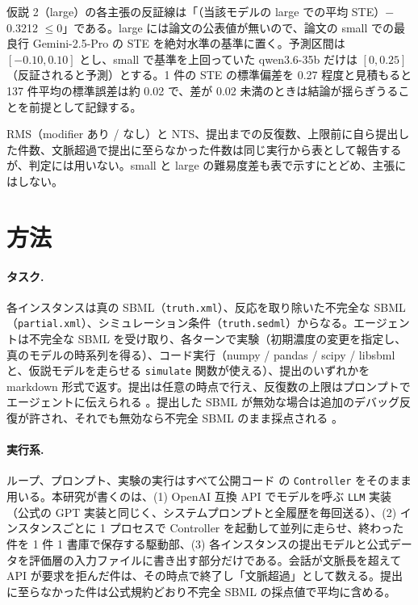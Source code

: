 \documentclass{article}
\providecommand{\unverified}[1]{#1}
\begin{document}
仮説 2（large）の各主張の反証線は「（当該モデルの large での平均 STE）$-$ \unverified{0.3212} $\le 0$」である。large には論文の公表値が無いので、論文の small での最良行 Gemini-2.5-Pro の STE \cite[s1.p5]{duan-2025-measuring} を絶対水準の基準に置く。予測区間は $[-0.10, 0.10]$ とし、small で基準を上回っていた qwen3.6-35b だけは $[0, 0.25]$（反証されると予測）とする。1 件の STE の標準偏差を 0.27 程度と見積もると 137 件平均の標準誤差は約 0.02 で、差が 0.02 未満のときは結論が揺らぎうることを前提として記録する。

RMS（modifier あり / なし）と NTS、提出までの反復数、上限前に自ら提出した件数、文脈超過で提出に至らなかった件数は同じ実行から表として報告するが、判定には用いない。small と large の難易度差も表で示すにとどめ、主張にはしない。

\section{方法}
\label{sec:method}
\paragraph{タスク.}
各インスタンスは真の SBML（\texttt{truth.xml}）、反応を取り除いた不完全な SBML（\texttt{partial.xml}）、シミュレーション条件（\texttt{truth.sedml}）からなる。エージェントは不完全な SBML を受け取り、各ターンで実験（初期濃度の変更を指定し、真のモデルの時系列を得る）、コード実行（numpy / pandas / scipy / libsbml と、仮説モデルを走らせる \texttt{simulate} 関数が使える）、提出のいずれかを markdown 形式で返す。提出は任意の時点で行え、反復数の上限はプロンプトでエージェントに伝えられる \cite[s1.p3]{duan-2025-measuring}。提出した SBML が無効な場合は追加のデバッグ反復が許され、それでも無効なら不完全 SBML のまま採点される \cite[s1.p4]{duan-2025-measuring}。

\paragraph{実行系.}
ループ、プロンプト、実験の実行はすべて公開コード \citep{h4duan-2025-scigym} の \texttt{Controller} をそのまま用いる。本研究が書くのは、(1) OpenAI 互換 API でモデルを呼ぶ \texttt{LLM} 実装（公式の GPT 実装と同じく、システムプロンプトと全履歴を毎回送る）、(2) インスタンスごとに 1 プロセスで Controller を起動して並列に走らせ、終わった件を 1 件 1 書庫で保存する駆動部、(3) 各インスタンスの提出モデルと公式データを評価層の入力ファイルに書き出す部分だけである。会話が文脈長を超えて API が要求を拒んだ件は、その時点で終了し「文脈超過」として数える。提出に至らなかった件は公式規約どおり不完全 SBML の採点値で平均に含める。
\end{document}
